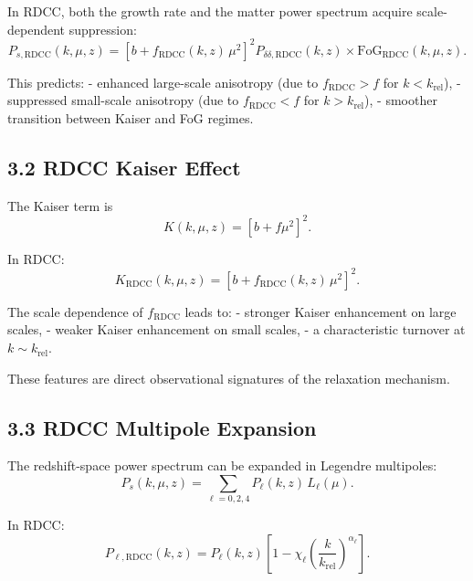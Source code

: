 \documentclass[11pt,a4paper]{article}
\begin{document}
In RDCC, both the growth rate and the matter power spectrum acquire scale-dependent
suppression:
\begin{equation}
P_{s,\mathrm{RDCC}}(k,\mu,z)
=
\left[
b + f_{\mathrm{RDCC}}(k,z)\,\mu^{2}
\right]^{2}
P_{\delta\delta,\mathrm{RDCC}}(k,z)
\times
\mathrm{FoG}_{\mathrm{RDCC}}(k,\mu,z).
\end{equation}

This predicts:
- enhanced large-scale anisotropy (due to $f_{\mathrm{RDCC}} > f$ for $k < k_{\mathrm{rel}}$),
- suppressed small-scale anisotropy (due to $f_{\mathrm{RDCC}} < f$ for $k > k_{\mathrm{rel}}$),
- smoother transition between Kaiser and FoG regimes.

\subsection{3.2 RDCC Kaiser Effect}

The Kaiser term is
\begin{equation}
K(k,\mu,z)
=
\left[
b + f\mu^{2}
\right]^{2}.
\end{equation}

In RDCC:
\begin{equation}
K_{\mathrm{RDCC}}(k,\mu,z)
=
\left[
b + f_{\mathrm{RDCC}}(k,z)\,\mu^{2}
\right]^{2}.
\end{equation}

The scale dependence of $f_{\mathrm{RDCC}}$ leads to:
- stronger Kaiser enhancement on large scales,
- weaker Kaiser enhancement on small scales,
- a characteristic turnover at $k \sim k_{\mathrm{rel}}$.

These features are direct observational signatures of the relaxation mechanism.

\subsection{3.3 RDCC Multipole Expansion}

The redshift-space power spectrum can be expanded in Legendre multipoles:
\begin{equation}
P_{s}(k,\mu,z)
=
\sum_{\ell=0,2,4}
P_{\ell}(k,z)\,L_{\ell}(\mu).
\end{equation}

In RDCC:
\begin{equation}
P_{\ell,\mathrm{RDCC}}(k,z)
=
P_{\ell}(k,z)
\left[
1
-
\chi_{\ell}
\left(
\frac{k}{k_{\mathrm{rel}}}
\right)^{\alpha_{\ell}}
\right].
\end{equation}
\end{document}
